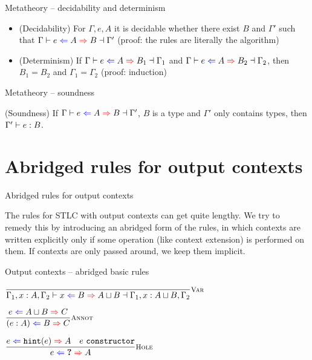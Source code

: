 \documentclass{beamer}
\begin{document}
\begin{frame}{Metatheory -- decidability and determinism}

\begin{itemize}
  \item (Decidability) For $\Gamma, e, A$ it is decidable whether there exist $B$ and $\Gamma'$ such that $\outctx[\Gamma]{e}{A}{B}[\Gamma']$ (proof: the rules are literally the algorithm)
  \item (Determinism) If $\outctx[\Gamma]{e}{A}{B_1}[\Gamma_1]$ and $\outctx[\Gamma]{e}{A}{B_2}[\Gamma_2]$, then $B_1 = B_2$ and $\Gamma_1 = \Gamma_2$ (proof: induction)
\end{itemize}

\end{frame}

\begin{frame}{Metatheory -- soundness}

(Soundness) If $\outctx[\Gamma]{e}{A}{B}[\Gamma']$, $B$ is a type and $\Gamma'$ only contains types, then $\typing[\Gamma']{e}{B}$.

\end{frame}

\section{Abridged rules for output contexts}

\begin{frame}{Abridged rules for output contexts}

The rules for STLC with output contexts can get quite lengthy. We try to remedy this by introducing an abridged form of the rules, in which contexts are written explicitly only if some operation (like context extension) is performed on them. If contexts are only passed around, we keep them implicit.

\end{frame}

\begin{frame}{Output contexts -- abridged basic rules}

\begin{center}
  $\infrule[Var]{}{\outctx[\Gamma_1, x : A, \Gamma_2]{x}{B}{\hintlub{A}{B}}[\Gamma_1, x : \hintlub{A}{B}, \Gamma_2]}$

  \vspace{2em}

  $\infrule[Annot]{\shortoutctx{e}{\hintlub{A}{B}}{C}}{\shortoutctx{\annot{e}{A}}{B}{C}}$

  \vspace{2em}

  $\infrule[Hole]{\shortoutctx{e}{\hintfor{e}}{A} \quad \sidecond{e\ \texttt{constructor}}}{\shortoutctx{e}{\Hole}{A}}$
\end{center}

\end{frame}
\end{document}
